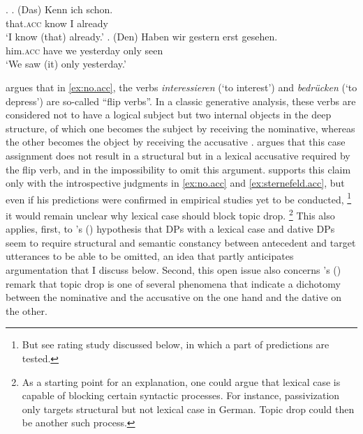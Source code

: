 \ex.\label{ex:sternefeld.acc}
\ag. (Das) Kenn ich schon.\\
that.\textsc{acc} know I already\\
`I know (that) already.'
\bg. (Den) Haben wir gestern erst gesehen.\\
him.\textsc{acc} have we yesterday only seen\\
`We saw (it) only yesterday.' \citep[][407, adapted, his judgments]{sternefeld1985}

\citet{sternefeld1985} argues that in \ref{ex:no.acc}, the verbs \textit{interessieren} (`to interest') and \textit{bedrücken} (`to depress') are so-called ``flip verbs''.
In a classic generative analysis, these verbs are considered not to have a logical subject but two internal objects in the deep structure, of which one becomes the subject by receiving the nominative,  whereas the other becomes the object by receiving the accusative  \citep[400; 427] {sternefeld1985}.
\citet[427] {sternefeld1985} argues that this case assignment does not result in a structural but in a lexical accusative  required by the flip verb, and in the impossibility to omit this argument.
\citet{sternefeld1985} supports this claim only with the introspective judgments in \ref{ex:no.acc} and \ref{ex:sternefeld.acc}, but even if his predictions were confirmed in empirical studies yet to be conducted,%
\footnote{But see  rating study discussed below, in which a part of  predictions are tested.}
%
it would remain unclear why lexical case should block topic drop.%
\footnote{As a starting point for an explanation, one could argue that lexical case is capable of blocking certain syntactic processes.
For instance, passivization only targets structural but not lexical case in German.
Topic drop could then be another such process.}
%
This also applies, first, to \citeauthor{fries1988}'s (\citeyear[31]{fries1988}) hypothesis that DPs with a lexical case and dative  DPs seem to require structural and semantic constancy between antecedent  and target utterances to be able to be omitted, an idea that partly anticipates  argumentation that I discuss below.
Second, this open issue also concerns \citeauthor{haider2010}'s (\citeyear[269, footnote 22]{haider2010}) remark that topic drop is one of several phenomena that indicate a dichotomy between the nominative  and the accusative  on the one hand and the dative  on the other.

